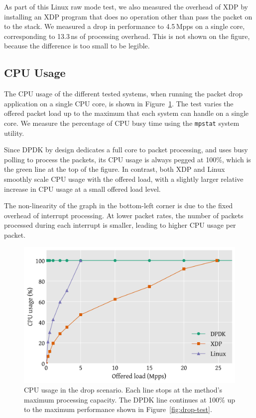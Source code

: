 \documentclass[sigconf]{acmart}
\begin{document}
As part of this Linux raw mode test, we also measured the overhead of XDP by
installing an XDP program that does no operation other than pass the packet on
to the stack. We measured a drop in performance to 4.5\,Mpps on a single core,
corresponding to 13.3\,ns of processing overhead.  This is not shown on the
figure, because the difference is too small to be legible.
%

\subsection{CPU Usage}
\label{sec:cpu-usage}

The CPU usage of the different tested systems, when running the packet drop
application on a single CPU core, is shown in Figure~\ref{fig:drop-cpu}. The
test varies the offered packet load up to the maximum that each system can
handle on a single core. We measure the percentage of CPU busy time using the
\texttt{mpstat} system utility.

Since DPDK by design dedicates a full core to packet processing, and uses busy
polling to process the packets, its CPU usage is always pegged at 100\%, which
is the green line at the top of the figure. In contrast, both XDP and Linux
smoothly scale CPU usage with the offered load, with a slightly larger relative
increase in CPU usage at a small offered load level.

The non-linearity of the graph in the bottom-left corner is due to the fixed
overhead of interrupt processing. At lower packet rates, the number of packets
processed during each interrupt is smaller, leading to higher CPU usage per
packet.

\begin{figure}[t]
\centering
\includegraphics[width=\linewidth]{figures/drop-cpu.pdf}
\caption{\label{fig:drop-cpu} CPU usage in the drop scenario. Each line stops at
  the method's maximum processing capacity. The DPDK line continues at 100\% up
  to the maximum performance shown in Figure~\ref{fig:drop-test}.}
\end{figure}
\end{document}
